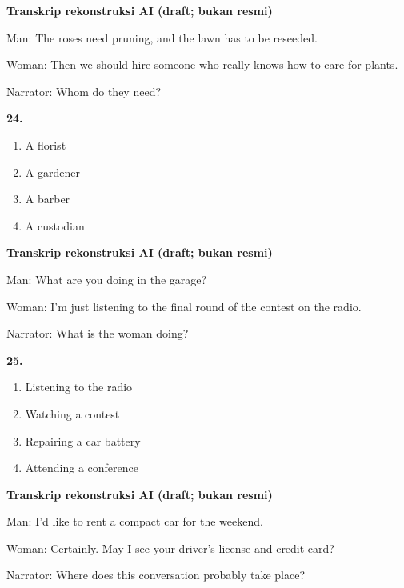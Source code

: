 \documentclass[12pt]{article}
\begin{document}
\par
\vspace{0.25\baselineskip}
\begin{exampleblock}
\textbf{Transkrip rekonstruksi AI (draft; bukan resmi)}\par
Man: The roses need pruning, and the lawn has to be reseeded.\par
Woman: Then we should hire someone who really knows how to care for plants.\par
Narrator: Whom do they need?\par
\end{exampleblock}
\noindent\textbf{24.}
\begin{enumerate}[label=(\Alph*),leftmargin=*,itemsep=0.2em]
\item A florist
\item A gardener
\item A barber
\item A custodian
\end{enumerate}
\par
\vspace{0.25\baselineskip}
\begin{exampleblock}
\textbf{Transkrip rekonstruksi AI (draft; bukan resmi)}\par
Man: What are you doing in the garage?\par
Woman: I'm just listening to the final round of the contest on the radio.\par
Narrator: What is the woman doing?\par
\end{exampleblock}
\noindent\textbf{25.}
\begin{enumerate}[label=(\Alph*),leftmargin=*,itemsep=0.2em]
\item Listening to the radio
\item Watching a contest
\item Repairing a car battery
\item Attending a conference
\end{enumerate}
\par
\vspace{0.25\baselineskip}
\begin{exampleblock}
\textbf{Transkrip rekonstruksi AI (draft; bukan resmi)}\par
Man: I'd like to rent a compact car for the weekend.\par
Woman: Certainly. May I see your driver's license and credit card?\par
Narrator: Where does this conversation probably take place?\par
\end{exampleblock}
\end{document}
